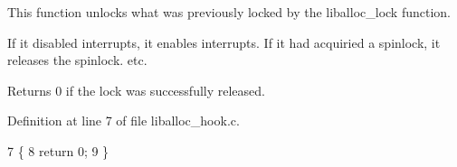 This function unlocks what was previously locked by the liballoc\+\_\+lock function. 

If it disabled interrupts, it enables interrupts. If it had acquiried a spinlock, it releases the spinlock. etc.

\begin{DoxyReturn}{Returns}
0 if the lock was successfully released. 
\end{DoxyReturn}


Definition at line 7 of file liballoc\+\_\+hook.\+c.


\begin{DoxyCode}
7                       \{
8     \textcolor{keywordflow}{return} 0;
9 \}
\end{DoxyCode}
